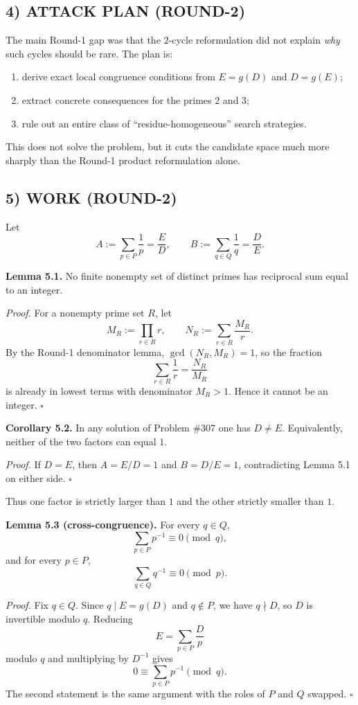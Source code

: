 \subsection*{4) ATTACK PLAN (ROUND-2)}
The main Round-1 gap was that the $2$-cycle reformulation did not explain \emph{why} such cycles should be rare. The plan is:

\begin{enumerate}
\item derive exact local congruence conditions from $E=g(D)$ and $D=g(E)$;
\item extract concrete consequences for the primes $2$ and $3$;
\item rule out an entire class of ``residue-homogeneous'' search strategies.
\end{enumerate}

This does not solve the problem, but it cuts the candidate space much more sharply than the Round-1 product reformulation alone.

\subsection*{5) WORK (ROUND-2)}
Let
\[
A:=\sum_{p\in P}\frac1p=\frac{E}{D},\qquad B:=\sum_{q\in Q}\frac1q=\frac{D}{E}.
\]

\textbf{Lemma 5.1.} No finite nonempty set of distinct primes has reciprocal sum equal to an integer.

\emph{Proof.}
For a nonempty prime set $R$, let
\[
M_R:=\prod_{r\in R} r,
\qquad
N_R:=\sum_{r\in R}\frac{M_R}{r}.
\]
By the Round-1 denominator lemma, $\gcd(N_R,M_R)=1$, so the fraction
\[
\sum_{r\in R}\frac1r=\frac{N_R}{M_R}
\]
is already in lowest terms with denominator $M_R>1$. Hence it cannot be an integer. \hfill $\square$

\medskip
\textbf{Corollary 5.2.} In any solution of Problem \#307 one has $D\neq E$. Equivalently, neither of the two factors can equal $1$.

\emph{Proof.}
If $D=E$, then $A=E/D=1$ and $B=D/E=1$, contradicting Lemma 5.1 on either side. \hfill $\square$

\medskip
Thus one factor is strictly larger than $1$ and the other strictly smaller than $1$.

\medskip
\textbf{Lemma 5.3 (cross-congruence).} For every $q\in Q$,
\[
\sum_{p\in P} p^{-1}\equiv 0 \pmod q,
\]
and for every $p\in P$,
\[
\sum_{q\in Q} q^{-1}\equiv 0 \pmod p.
\]

\emph{Proof.}
Fix $q\in Q$. Since $q\mid E=g(D)$ and $q\notin P$, we have $q\nmid D$, so $D$ is invertible modulo $q$. Reducing
\[
E=\sum_{p\in P}\frac{D}{p}
\]
modulo $q$ and multiplying by $D^{-1}$ gives
\[
0\equiv \sum_{p\in P} p^{-1}\pmod q.
\]
The second statement is the same argument with the roles of $P$ and $Q$ swapped. \hfill $\square$

